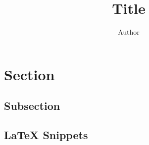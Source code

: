 \documentclass[stu,12pt,floatsintext]{apa7}
\title{Title}
\author{Author}
\begin{document}
\maketitle

\section{Section}
\subsection{Subsection}
\lipsum[2-3]

\begin{appendix}
  \section{\LaTeX{} Snippets}
  
  
  
  
  
  
\end{appendix}

\printbibliography{}

\end{document}
